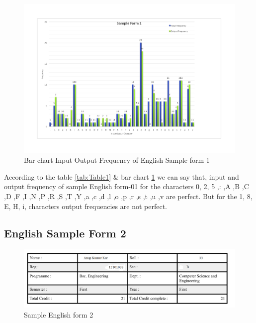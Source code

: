 \begin{figure}[H]
\centering
\includegraphics[width=1\textwidth]{form1.pdf}
\caption {Bar chart Input Output Frequency of English Sample form 1}
\label {fig:bar1}
\end{figure}
According to the table \ref{tab:Table1} \& bar chart \ref{fig:bar1} we can say that, input and output frequency of sample English form-01 for the characters 0, 2, 5 ,: ,A ,B ,C ,D ,F ,I ,N ,P ,R ,S ,T ,Y ,a ,c ,d ,l ,o ,p ,r ,s ,t ,u ,v are perfect. But for the 1, 8, E, H, i, characters output frequencies are not perfect. 
\subsection{English Sample Form 2}

\begin{figure}[H]
\centering
\includegraphics[width=1\textwidth]{form2.png}
\caption {Sample English form 2}
\label {fig:form2}
\end{figure}

